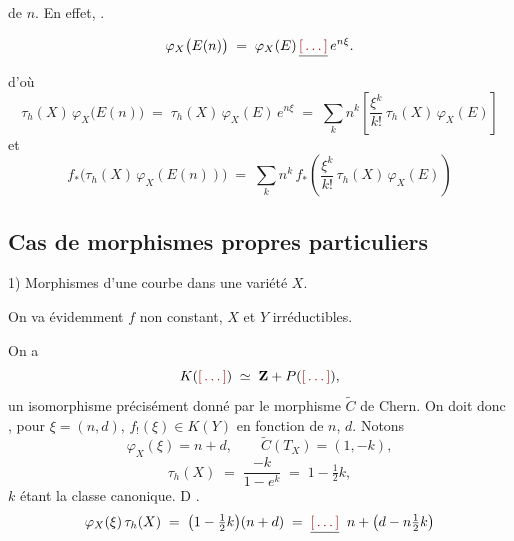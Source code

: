 \documentclass[11pt,a4paper]{article}
\begin{document}

de $n$. En effet, \ill{}.

\[
  \varphi_{X}\bigl(E(n)\bigr) \;=\; \varphi_{X}(E)\,\struck{\ill{}}\,e^{n\xi} .
\]
d'où
\[
  \tau_{h}(X)\,\varphi_{X}\bigl(E(n)\bigr)
  \;=\; \tau_{h}(X)\,\varphi_{X}(E)\,e^{n\xi}
  \;=\; \sum_{k} n^{k}\left[\frac{\xi^{k}}{k!}\,\tau_{h}(X)\,\varphi_{X}(E)\right]
\]
et
\[
  f_{*}\bigl(\tau_{h}(X)\,\varphi_{X}(E(n))\bigr)
  \;=\; \sum_{k} n^{k}\, f_{*}\!\left(\frac{\xi^{k}}{k!}\,\tau_{h}(X)\,\varphi_{X}(E)\right)
\]

\subsection*{Cas de morphismes propres particuliers}

1) Morphismes d'une courbe \struck{\ill{}} dans une variété $X$.

On va évidemment  $f$ non constant, $X$ et $Y$
irréductibles.

\struck{\ill{}}

On a
\[
  K(\ill{}) \;\simeq\; \mathbf{Z} + P(\ill{}),
\]
un isomorphisme  précisément donné par le morphisme
\struck{\ill{}} $\widetilde{C}$ de Chern. On doit donc \struck{\ill{}}
, pour $\xi = (n,d)$,  $f_{!}(\xi) \in K(Y)$ en
fonction de $n$, $d$. Notons \ill{}
\[
  \varphi_{X}(\xi) = n + d,
  \qquad \widetilde{C}(T_{X}) = (1, -k),
\]
\[
  \tau_{h}(X) \;=\; \frac{-k}{1 - e^{k}}
  \;=\; 1 - \tfrac{1}{2}k,
\]
$k$ étant la classe canonique. D\ill{}
.
\[
  \varphi_{X}(\xi)\,\tau_{h}(X)
  \;=\; \bigl(1 - \tfrac{1}{2}k\bigr)(n + d)
  \;=\; \struck{\ill{}}\;\; n + \bigl(d - n\tfrac{1}{2}k\bigr)
\]
\end{document}
